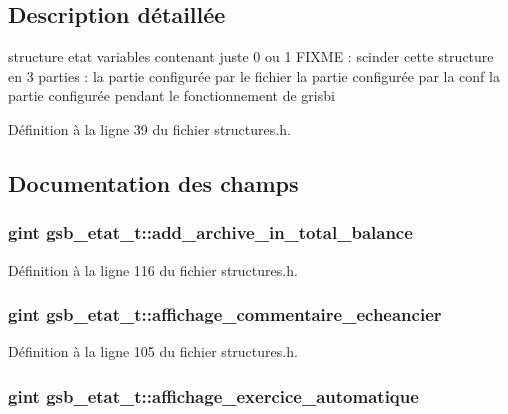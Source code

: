 \subsection{Description détaillée}
structure etat variables contenant juste 0 ou 1 FIXME : scinder cette structure en 3 parties : la partie configurée par le fichier la partie configurée par la conf la partie configurée pendant le fonctionnement de grisbi 

Définition à la ligne 39 du fichier structures.h.



\subsection{Documentation des champs}
\subsubsection[{add\_\-archive\_\-in\_\-total\_\-balance}]{\setlength{\rightskip}{0pt plus 5cm}gint {\bf gsb\_\-etat\_\-t::add\_\-archive\_\-in\_\-total\_\-balance}}\label{structgsb__etat__t_afe6525697e72cd23f1bdafea6642fd37}


Définition à la ligne 116 du fichier structures.h.

\subsubsection[{affichage\_\-commentaire\_\-echeancier}]{\setlength{\rightskip}{0pt plus 5cm}gint {\bf gsb\_\-etat\_\-t::affichage\_\-commentaire\_\-echeancier}}\label{structgsb__etat__t_a973a219fce3f9cbfdd56022173c50206}


Définition à la ligne 105 du fichier structures.h.

\subsubsection[{affichage\_\-exercice\_\-automatique}]{\setlength{\rightskip}{0pt plus 5cm}gint {\bf gsb\_\-etat\_\-t::affichage\_\-exercice\_\-automatique}}\label{structgsb__etat__t_a03f2612a11dacafc16a35d08fc394527}


